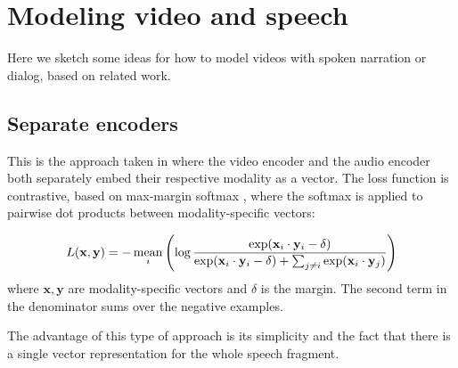 \appendix
\section{Modeling video and speech}
Here we sketch some ideas for how to model videos with spoken
narration or dialog, based on related work.

\subsection{Separate encoders}
This is the approach taken in \citet{rouditchenko2020avlnet} where the
video encoder and the audio encoder both separately embed their
respective modality as a vector. The loss function is contrastive,
based on max-margin softmax \citep{ilharco-etal-2019-large}, where the
softmax is applied to pairwise dot products between modality-specific
vectors:

\begin{equation}
  \label{eq:mms}
  L(\mathbf{x}, \mathbf{y}) = - \operatorname*{mean}_i \left(
    \log \frac{\exp(\mathbf{x}_i\cdot \mathbf{y}_i-\delta)}
    { \exp(\mathbf{x}_i\cdot \mathbf{y}_i-\delta) + \sum_{j\neq i}
      \exp(\mathbf{x}_i \cdot \mathbf{y}_j)  }
  \right)
\end{equation}
where $\mathbf{x, y}$ are modality-specific vectors and $\delta$ is the
margin. The second term in the denominator sums over the negative
examples.

The advantage of this type of approach is its simplicity and the fact
that there is a single vector representation for the whole speech
fragment.

